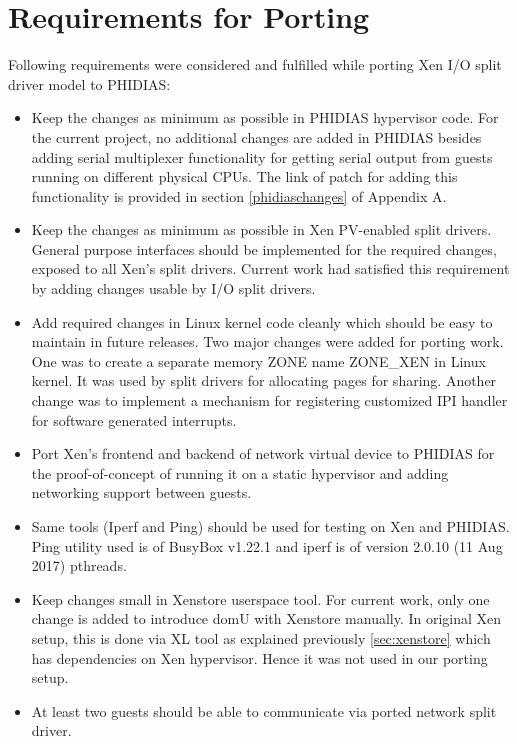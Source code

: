 \section{Requirements for Porting\label{sec:xen}}
Following requirements were considered and fulfilled while porting Xen I/O split driver model to PHIDIAS:
\begin{itemize}
	\item Keep the changes as minimum as possible in PHIDIAS hypervisor code. For the current project, no additional changes are added in PHIDIAS besides adding serial multiplexer functionality for getting serial output from guests running on different physical CPUs. The link of patch for adding this functionality is provided in  section \ref{phidiaschanges} of Appendix A.
	\item Keep the changes as minimum as possible in Xen PV-enabled split drivers. General purpose interfaces should be implemented for the required changes, exposed to all Xen's split drivers. Current work had satisfied this requirement by adding changes usable by I/O split drivers.
	\item Add required changes in Linux kernel code cleanly which should be easy to maintain in future releases. Two major changes were added for porting work. One was to create a separate memory ZONE name ZONE\_XEN in Linux kernel. It was used by split drivers for allocating pages for sharing. Another change was to implement a mechanism for registering customized IPI handler for software generated interrupts.
	\item Port Xen's frontend and backend of network virtual device to PHIDIAS for the proof-of-concept of running it on a static hypervisor and adding networking support between guests.
	\item Same tools (Iperf and Ping) should be used for testing on Xen and PHIDIAS. Ping utility used is of BusyBox v1.22.1 and iperf is of version 2.0.10 (11 Aug 2017) pthreads.
	\item Keep changes small in Xenstore userspace tool. For current work, only one change is added to introduce domU with Xenstore manually. In original Xen setup, this is done via XL tool as explained previously \ref{sec:xenstore} which has dependencies on Xen hypervisor. Hence it was not used in our porting setup.
	\item At least two guests should be able to communicate via ported network split driver.
\end{itemize}

